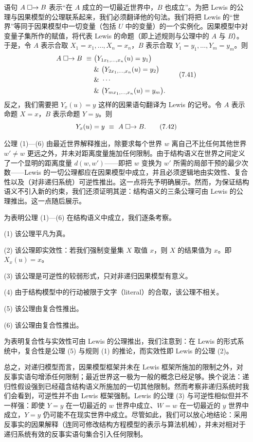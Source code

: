 语句 $A\mathrel{\square\!\!\rightarrow} B$ 表示“在 $A$ 成立的一切最近世界中，$B$ 也成立”。为把 Lewis 的公理与因果模型的公理联系起来，我们必须翻译他的句法。我们将把 Lewis 的“世界”等同于因果模型中一切变量（包括 $U$ 中的变量）的一个实例化。因果模型中对变量子集所作的赋值，将代表 Lewis 的命题（即上述规则与公理中的 $A$ 与 $B$）。于是，令 $A$ 表示合取 $X_1=x_1,\dots,X_n=x_n$，$B$ 表示合取 $Y_1=y_1,\dots,Y_m=y_m$。则
\begin{equation}
\begin{aligned}
A\mathrel{\square\!\!\rightarrow} B\ \equiv\ & \bigl(Y_{1x_1,\dots,x_n}(u)=y_1\bigr)\\
&\&\ \bigl(Y_{2x_1,\dots,x_n}(u)=y_2\bigr)\\
&\&\ \cdots\\
&\&\ \bigl(Y_{mx_1,\dots,x_n}(u)=y_m\bigr).
\end{aligned}\tag{7.41}
\end{equation}
反之，我们需要把 $Y_x(u)=y$ 这样的因果语句翻译为 Lewis 的记号。令 $A$ 表示命题 $X=x$，$B$ 表示命题 $Y=y$。则
\begin{equation}
Y_x(u)=y\ \equiv\ A\mathrel{\square\!\!\rightarrow} B. \tag{7.42}
\end{equation}

公理 (1)—(6) 由最近世界解释推出，除要求每个世界 $w$ 离自己不比任何其他世界 $w'\ne w$ 更远之外，并未对距离度量施加任何限制。由于结构语义在世界之间定义了一个显明的距离度量 $d(w,w')$——即把 $w$ 变换为 $w'$ 所需的局部干预的最少次数——Lewis 的一切公理都应在因果模型中成立，并且必须逻辑地由实效性、复合性以及（对非递归系统）可逆性推出。这一点将先予明确展示。然而，为保证结构语义不引入新的约束，我们还须证明其逆：结构语义的三条公理可由 Lewis 的公理推出。这一点随后展示。

为表明公理 (1)—(6) 在结构语义中成立，我们逐条考察。

(1) 该公理平凡为真。

(2) 该公理即实效性：若我们强制变量集 $X$ 取值 $x$，则 $X$ 的结果值为 $x$。即 $X_x(u)=x$。

(3) 该公理是可逆性的较弱形式，只对非递归因果模型有意义。

(4) 由于结构模型中的行动被限于文字（literal）的合取，该公理不相关。

(5) 该公理由复合性推出。

(6) 该公理由复合性推出。

为表明复合性与实效性可由 Lewis 的公理推出，我们注意到：在 Lewis 的形式系统中，复合性是公理 (5) 与规则 (1) 的推论，而实效性即 Lewis 的公理 (2)。

总之，对递归模型而言，因果模型框架并未在 Lewis 框架所施加的限制之外，对反事实语句增添任何限制；最近世界这一极为一般的概念已经足够。换个说法：递归性假设强到已经蕴含结构语义所施加的一切其他限制。然而考察非递归系统时我们会看到，可逆性并不由 Lewis 框架强制。Lewis 的公理 (3) 与可逆性相似但并不一样强：即使 $Y=y$ 在一切最近的 $w$ 世界中成立、$W=w$ 在一切最近的 $y$ 世界中成立，$Y=y$ 仍可能不在现实世界中成立。尽管如此，我们可以放心地结论：采用反事实的因果解释（连同可修改结构方程模型的表示与算法机械），并未对相对于递归系统有效的反事实语句集合引入任何限制。

